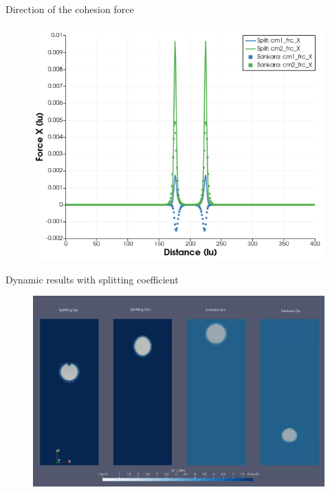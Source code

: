 \documentclass[8pt]{beamer}
\begin{document}
	\begin{frame}{Direction of the cohesion force}
		\begin{figure}
			\includegraphics[width=\textheight]{pics/bubbles/forceProfileSankSplit.png}
		\end{figure}
	\end{frame}
	\begin{frame}{Dynamic results with splitting coefficient}
		\begin{figure}
			\centering
			\includegraphics[width=1.0\textwidth]{pics/bubbles/comparisonSphElp.png}
		\end{figure}
	\end{frame}
\end{document}
